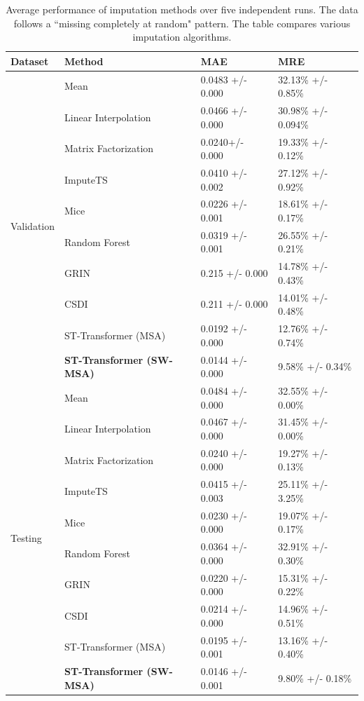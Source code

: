 \documentclass[11pt]{article}
\begin{document}
\begin{table}[h!]
    \centering
    \begin{tabularx}{\textwidth}{llXX}
        \toprule
        Dataset & Method & MAE & MRE \\
        \midrule
         \multirow{10}{*}{Validation}&Mean & 0.0483 +/- 0.000& 32.13\% +/- 0.85\%  \\
        &Linear Interpolation & 0.0466 +/- 0.000 & 30.98\% +/- 0.094\%\\
        &Matrix Factorization & 0.0240+/- 0.000 & 19.33\% +/- 0.12\% \\
        &ImputeTS & 0.0410 +/- 0.002 & 27.12\% +/- 0.92\% \\
        &Mice & 0.0226 +/- 0.001& 18.61\% +/- 0.17\% \\
        &Random Forest &  0.0319 +/- 0.001&  26.55\% +/- 0.21\%\\
   		&GRIN &0.215 +/- 0.000 & 14.78\% +/- 0.43\%\\
        &CSDI & 0.211 +/- 0.000 & 14.01\% +/- 0.48\%\\
        &ST-Transformer (MSA) & 0.0192 +/- 0.000 & 12.76\% +/- 0.74\%\\
        &\textbf{ST-Transformer (SW-MSA)} & 0.0144 +/- 0.000 & 9.58\% +/- 0.34\%\\
        
        \midrule
        \multirow{10}{*}{Testing}&Mean & 0.0484 +/- 0.000 & 32.55\% +/- 0.00\%  \\
        &Linear Interpolation & 0.0467 +/- 0.000& 31.45\% +/- 0.00\%\\
        &Matrix Factorization & 0.0240 +/- 0.000& 19.27\% +/- 0.13\% \\
        &ImputeTS & 0.0415 +/- 0.003 & 25.11\% +/- 3.25\% \\
        &Mice & 0.0230 +/- 0.000& 19.07\% +/- 0.17\% \\
        &Random Forest &  0.0364 +/- 0.000&  32.91\% +/- 0.30\%\\
        &GRIN &0.0220 +/- 0.000 & 15.31\% +/- 0.22\%\\
        &CSDI & 0.0214 +/- 0.000 & 14.96\% +/- 0.51\%\\
        &ST-Transformer (MSA) & 0.0195 +/- 0.001 & 13.16\% +/- 0.40\%\\

        &\textbf{ST-Transformer (SW-MSA)} & 0.0146 +/- 0.001 & 9.80\% +/- 0.18\%\\
        
        \bottomrule

        
    \end{tabularx}
    \caption{Average performance of imputation methods over five independent runs. The data follows a ``missing completely at random" pattern. The table compares various imputation algorithms.}
    \label{tab: missing at random}
\end{table}
\end{document}
